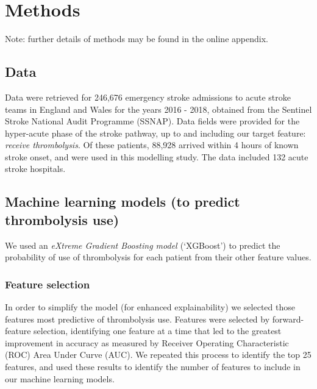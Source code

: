 \renewcommand{\thefootnote}{\alph{footnote}} %

\section{Methods}

Note: further details of methods may be found in the online appendix. 


\subsection{Data}

Data were retrieved for 246,676 emergency stroke admissions to acute stroke teams in England and Wales for the years 2016 - 2018, obtained from the Sentinel Stroke National Audit Programme (SSNAP). Data fields were provided for the hyper-acute phase of the stroke pathway, up to and including our target feature: \emph{receive thrombolysis}. Of these patients, 88,928 arrived within 4 hours of known stroke onset, and were used in this modelling study. The data included 132 acute stroke hospitals.


\subsection{Machine learning models (to predict thrombolysis use)}

We used an \emph{eXtreme Gradient Boosting model \cite{chen_xgboost_2016}} (`XGBoost') to predict the probability of use of thrombolysis for each patient from their other feature values.


\subsubsection{Feature selection}

In order to simplify the model (for enhanced explainability) we selected those features most predictive of thrombolysis use. Features were selected by forward-feature selection, identifying one feature at a time that led to the greatest improvement in accuracy as measured by Receiver Operating Characteristic (ROC) Area Under Curve (AUC). We repeated this process to identify the top 25 features, and used these results to identify the number of features to include in our machine learning models.

